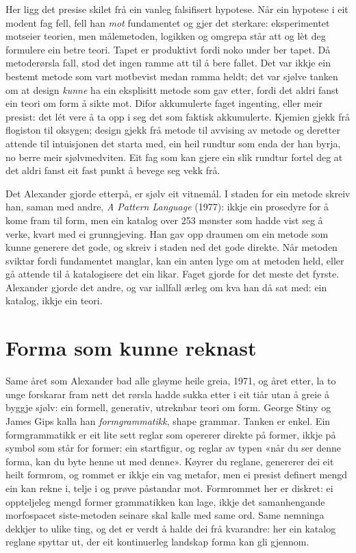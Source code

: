 Her ligg det presise skilet frå ein vanleg falsifisert hypotese. Når ein hypotese i eit modent fag fell, fell han \emph{mot} fundamentet og gjer det sterkare: eksperimentet motseier teorien, men målemetoden, logikken og omgrepa står att og lèt deg formulere ein betre teori. Tapet er produktivt fordi noko under ber tapet. Då metoderørsla fall, stod det ingen ramme att til å bere fallet. Det var ikkje ein bestemt metode som vart motbevist medan ramma heldt; det var sjølve tanken om at design \emph{kunne} ha ein eksplisitt metode som gav etter, fordi det aldri fanst ein teori om form å sikte mot. Difor akkumulerte faget ingenting, eller meir presist: det lét vere å ta opp i seg det som faktisk akkumulerte. Kjemien gjekk frå flogiston til oksygen; design gjekk frå metode til avvising av metode og deretter attende til intuisjonen det starta med, ein heil rundtur som enda der han byrja, no berre meir sjølvmedviten. Eit fag som kan gjere ein slik rundtur fortel deg at det aldri fanst eit fast punkt å bevege seg vekk frå.

Det Alexander gjorde etterpå, er sjølv eit vitnemål. I staden for ein metode skreiv han, saman med andre, \textit{A Pattern Language} (1977): ikkje ein prosedyre for å kome fram til form, men ein katalog over 253 mønster som hadde vist seg å verke, kvart med ei grunngjeving\autocite{alexander1977pattern}. Han gav opp draumen om ein metode som kunne generere det gode, og skreiv i staden ned det gode direkte. Når metoden sviktar fordi fundamentet manglar, kan ein anten lyge om at metoden held, eller gå attende til å katalogisere det ein likar. Faget gjorde for det meste det fyrste. Alexander gjorde det andre, og var iallfall ærleg om kva han då sat med: ein katalog, ikkje ein teori.

\section{Forma som kunne reknast}

Same året som Alexander bad alle gløyme heile greia, 1971, og året etter, la to unge forskarar fram nett det rørsla hadde sukka etter i eit tiår utan å greie å byggje sjølv: ein formell, generativ, utreknbar teori om form. George Stiny og James Gips kalla han \emph{formgrammatikk}, shape grammar\autocite{stiny1972}. Tanken er enkel. Ein formgrammatikk er eit lite sett reglar som opererer direkte på former, ikkje på symbol som står for former: ein startfigur, og reglar av typen «når du ser denne forma, kan du byte henne ut med denne». Køyrer du reglane, genererer dei eit heilt formrom, og rommet er ikkje ein vag metafor, men ei presist definert mengd ein kan rekne i, telje i og prøve påstandar mot. Formrommet her er diskret: ei oppteljeleg mengd former grammatikken kan lage, ikkje det samanhengande morfospacet siste-metoden seinare skal kalle med same ord. Same nemninga dekkjer to ulike ting, og det er verdt å halde dei frå kvarandre: her ein katalog reglane spyttar ut, der eit kontinuerleg landskap forma kan gli gjennom.

